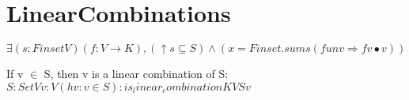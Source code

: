 \section{LinearCombinations}

\begin{definition}
  \label{definition : linear_combination}
  \leanok
  $\exists (s : Finset V) (f : V → K), (↑s ⊆ S) ∧ (x = Finset.sum s (fun v \Rightarrow f v \bullet v))$
\end{definition}

\begin{theorem}
  \label{theorem : linear_combination_of_mem}
  \leanok
  If v $\in$ S, then v is a linear combination of S: ${S : Set V} {v : V} (hv : v \in S) : is_linear_combination K V S v$
\end{theorem}
